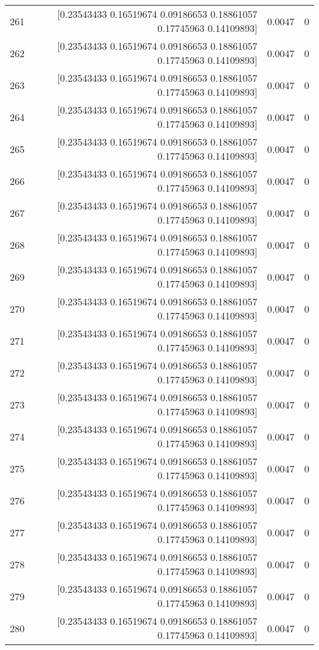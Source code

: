 \begin{longtable}{lrrr}
261 & [0.23543433 0.16519674 0.09186653 0.18861057 0.17745963 0.14109893] & 0.0047 & 0 \\
262 & [0.23543433 0.16519674 0.09186653 0.18861057 0.17745963 0.14109893] & 0.0047 & 0 \\
263 & [0.23543433 0.16519674 0.09186653 0.18861057 0.17745963 0.14109893] & 0.0047 & 0 \\
264 & [0.23543433 0.16519674 0.09186653 0.18861057 0.17745963 0.14109893] & 0.0047 & 0 \\
265 & [0.23543433 0.16519674 0.09186653 0.18861057 0.17745963 0.14109893] & 0.0047 & 0 \\
266 & [0.23543433 0.16519674 0.09186653 0.18861057 0.17745963 0.14109893] & 0.0047 & 0 \\
267 & [0.23543433 0.16519674 0.09186653 0.18861057 0.17745963 0.14109893] & 0.0047 & 0 \\
268 & [0.23543433 0.16519674 0.09186653 0.18861057 0.17745963 0.14109893] & 0.0047 & 0 \\
269 & [0.23543433 0.16519674 0.09186653 0.18861057 0.17745963 0.14109893] & 0.0047 & 0 \\
270 & [0.23543433 0.16519674 0.09186653 0.18861057 0.17745963 0.14109893] & 0.0047 & 0 \\
271 & [0.23543433 0.16519674 0.09186653 0.18861057 0.17745963 0.14109893] & 0.0047 & 0 \\
272 & [0.23543433 0.16519674 0.09186653 0.18861057 0.17745963 0.14109893] & 0.0047 & 0 \\
273 & [0.23543433 0.16519674 0.09186653 0.18861057 0.17745963 0.14109893] & 0.0047 & 0 \\
274 & [0.23543433 0.16519674 0.09186653 0.18861057 0.17745963 0.14109893] & 0.0047 & 0 \\
275 & [0.23543433 0.16519674 0.09186653 0.18861057 0.17745963 0.14109893] & 0.0047 & 0 \\
276 & [0.23543433 0.16519674 0.09186653 0.18861057 0.17745963 0.14109893] & 0.0047 & 0 \\
277 & [0.23543433 0.16519674 0.09186653 0.18861057 0.17745963 0.14109893] & 0.0047 & 0 \\
278 & [0.23543433 0.16519674 0.09186653 0.18861057 0.17745963 0.14109893] & 0.0047 & 0 \\
279 & [0.23543433 0.16519674 0.09186653 0.18861057 0.17745963 0.14109893] & 0.0047 & 0 \\
280 & [0.23543433 0.16519674 0.09186653 0.18861057 0.17745963 0.14109893] & 0.0047 & 0 \\

\end{longtable}
